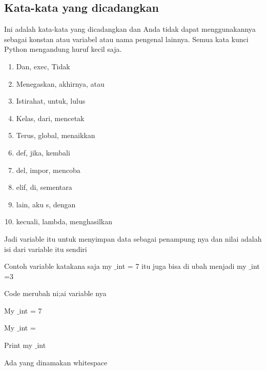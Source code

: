 \subsection{Kata-kata yang dicadangkan}
Ini adalah kata-kata yang dicadangkan dan Anda tidak dapat menggunakannya sebagai konstan atau variabel 
atau nama pengenal lainnya. Semua kata kunci Python mengandung huruf kecil saja.
	\begin{enumerate}
	    \item Dan, exec, Tidak
	    \item Menegaskan, akhirnya, atau
	    \item Istirahat, untuk, lulus
	    \item Kelas, dari, mencetak
	    \item Terus, global, menaikkan
	    \item def, jika, kembali
	    \item del, impor, mencoba
	    \item elif, di, sementara
	    \item lain, aku s, dengan
	    \item kecuali, lambda, menghasilkan
	\end{enumerate}
{\fontsize{14pt}{14pt}\selectfont Jadi variable itu untuk menyimpan data sebagai penampung nya dan nilai adalah isi dari variable itu sendiri \\} \par
\vspace{14pt}
\noindent 
{\fontsize{14pt}{14pt}\selectfont Contoh variable katakana saja my $  \_  $int = 7 itu juga bisa di ubah menjadi my $  \_  $int =3  \\} \par
\vspace{14pt}
\noindent 
{\fontsize{14pt}{14pt}\selectfont Code merubah ni;ai variable nya  \\} \par
\noindent 
{\fontsize{14pt}{14pt}\selectfont My $  \_  $int = 7 \\} \par
\noindent 
{\fontsize{14pt}{14pt}\selectfont My $  \_  $int = \\} \par
\noindent 
{\fontsize{14pt}{14pt}\selectfont Print my $  \_  $int \\} \par
\vspace{14pt}
\noindent 
{\fontsize{14pt}{14pt}\selectfont Ada yang dinamakan whitespace  \\} \par
